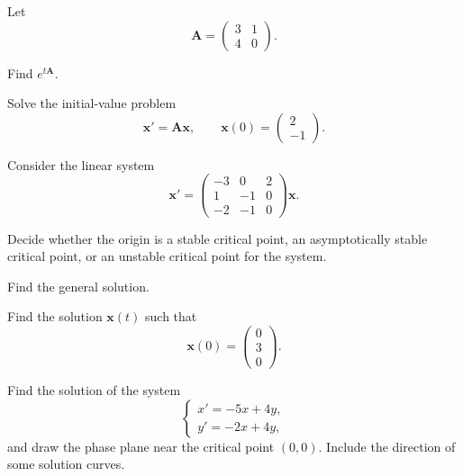 \begin{problem}
Let
\[
\mathbf A=
\begin{pmatrix}
3&1\\
4&0
\end{pmatrix}.
\]
\begin{problemsubparts}
\item Find $e^{t\mathbf A}$.
\item Solve the initial-value problem
\[
\mathbf x'=\mathbf A\mathbf x,
\qquad
\mathbf x(0)=
\begin{pmatrix}
2\\
-1
\end{pmatrix}.
\]
\end{problemsubparts}
\end{problem}

\begin{problem}
Consider the linear system
\[
\mathbf x'=
\begin{pmatrix}
-3&0&2\\
1&-1&0\\
-2&-1&0
\end{pmatrix}\mathbf x.
\]
\begin{problemsubparts}
\item Decide whether the origin is a stable critical point, an asymptotically stable critical point, or an unstable critical point for the system.
\item Find the general solution.
\item Find the solution $\mathbf x(t)$ such that
\[
\mathbf x(0)=
\begin{pmatrix}
0\\3\\0
\end{pmatrix}.
\]
\end{problemsubparts}
\end{problem}

\begin{problem}
Find the solution of the system
\[
\begin{cases}
x'=-5x+4y,\\
y'=-2x+4y,
\end{cases}
\]
and draw the phase plane near the critical point $(0,0)$. Include the direction of some solution curves.
\end{problem}

